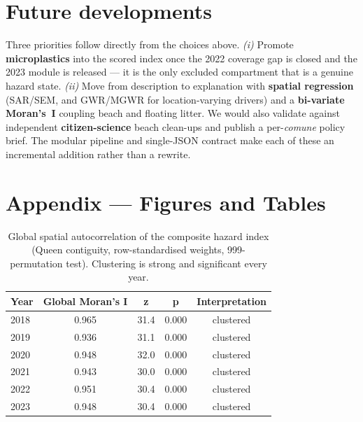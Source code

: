 \documentclass[11pt,a4paper]{article}
\begin{document}
\section{Future developments}
Three priorities follow directly from the choices above. \emph{(i)} Promote \textbf{microplastics}
into the scored index once the 2022 coverage gap is closed and the 2023 module is released --- it is
the only excluded compartment that is a genuine hazard state. \emph{(ii)} Move from description to explanation with \textbf{spatial regression}
(SAR/SEM, and GWR/MGWR for location-varying drivers) and a \textbf{bi-variate Moran's~I} coupling
beach and floating litter. We would also validate against independent \textbf{citizen-science} beach
clean-ups and publish a per-\textit{comune} policy brief. The modular pipeline and single-JSON
contract make each of these an incremental addition rather than a rewrite.

\appendix
\clearpage
\section*{Appendix --- Figures and Tables}
\renewcommand{\thefigure}{A\arabic{figure}}
\renewcommand{\thetable}{A\arabic{table}}
\setcounter{figure}{0}\setcounter{table}{0}

\begin{table}[h]
\centering\small
\begin{tabular}{@{}lcccc@{}}
\toprule
\textbf{Year} & \textbf{Global Moran's I} & \textbf{z} & \textbf{p} & \textbf{Interpretation}\\
\midrule
2018 & 0.965 & 31.4 & 0.000 & clustered\\
2019 & 0.936 & 31.1 & 0.000 & clustered\\
2020 & 0.948 & 32.0 & 0.000 & clustered\\
2021 & 0.943 & 30.0 & 0.000 & clustered\\
2022 & 0.951 & 30.4 & 0.000 & clustered\\
2023 & 0.948 & 30.4 & 0.000 & clustered\\
\bottomrule
\end{tabular}
\caption{Global spatial autocorrelation of the composite hazard index (Queen contiguity,
row-standardised weights, 999-permutation test). Clustering is strong and significant every year.}
\label{tab:moran}
\end{table}
\end{document}
